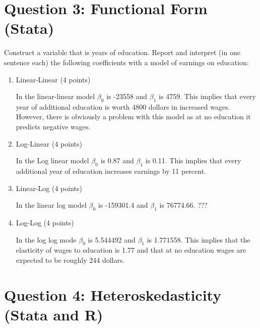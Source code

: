 \documentclass{article}
\begin{document}
\section{Question 3:  Functional Form (Stata)}
Construct a variable that is years of education. Report and interpret (in one sentence each) the following coefficients with a model of earnings on education:

\begin{enumerate}[label=\alph*]

\item Linear-Linear (4 points)

In the linear-linear model $\beta_0$ is -23558 and $\beta_1$ is 4759.  This implies that every year of additional education is worth 4800 dollars in increased wages.  However, there is obviously a problem with this model as at no education it predicts negative wages.

\item Log-Linear (4 points)

In the Log linear model $\beta_0$ is 0.87 and $\beta_1$ is 0.11.  This implies that every additional year of education increases earnings by 11 percent.

\item Linear-Log (4 points)

In the linear log model $\beta_0$ is -159301.4  and $\beta_1$ is 76774.66.  ???

\item Log-Log (4 points)

In the log log mode $\beta_0$ is  5.544492 and $\beta_1$ is  1.771558.  This implies that the elasticity of wages to education is 1.77 and that at no education wages are expected to be roughly 244 dollars.

\end{enumerate}

\section{Question 4:  Heteroskedasticity (Stata and R)}
\end{document}
